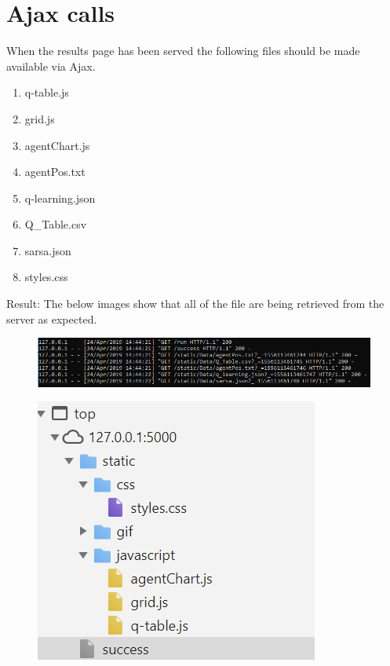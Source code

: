 \section{Ajax calls}
When the results page has been served the following files should be made available via Ajax.
\begin{enumerate}
	\item q-table.js
	\item grid.js
	\item agentChart.js
	\item agentPos.txt
	\item q-learning.json
	\item Q\_Table.csv
	\item sarsa.json
	\item styles.css
\end{enumerate}
Result:
The below images show that all of the file are being retrieved from the server as expected.
\begin{figure}[H]
	\centering
	\includegraphics[width=1\linewidth]{"img/data files"}
	\caption{}
	\label{fig:data-files}
\end{figure}
\begin{figure}[H]
	\centering
	\includegraphics[width=0.7\linewidth]{"img/Ajax files"}
	\caption{}
	\label{fig:ajax-files}
\end{figure}

